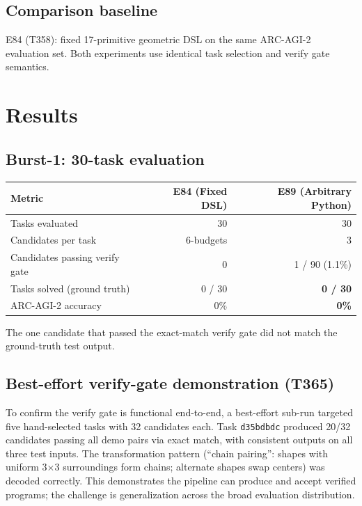 \documentclass[11pt]{article}
\begin{document}
\subsection{Comparison baseline}

E84 (T358): fixed 17-primitive geometric DSL on the same ARC-AGI-2 evaluation set.
Both experiments use identical task selection and verify gate semantics.

\section{Results}
\label{sec:results}

\subsection{Burst-1: 30-task evaluation}

\begin{center}
\begin{tabular}{lrr}
\toprule
Metric & E84 (Fixed DSL) & E89 (Arbitrary Python) \\
\midrule
Tasks evaluated & 30 & 30 \\
Candidates per task & 6-budgets & 3 \\
Candidates passing verify gate & 0 & 1 / 90 (1.1\%) \\
Tasks solved (ground truth) & 0 / 30 & \textbf{0 / 30} \\
ARC-AGI-2 accuracy & 0\% & \textbf{0\%} \\
\bottomrule
\end{tabular}
\end{center}

The one candidate that passed the exact-match verify gate did not match the
ground-truth test output.

\subsection{Best-effort verify-gate demonstration (T365)}

To confirm the verify gate is functional end-to-end, a best-effort sub-run
targeted five hand-selected tasks with 32 candidates each.  Task
\texttt{d35bdbdc} produced 20/32 candidates passing all demo pairs via exact
match, with consistent outputs on all three test inputs.  The transformation
pattern (``chain pairing'': shapes with uniform 3$\times$3 surroundings form
chains; alternate shapes swap centers) was decoded correctly.
This demonstrates the pipeline can produce and accept verified programs; the
challenge is generalization across the broad evaluation distribution.
\end{document}
